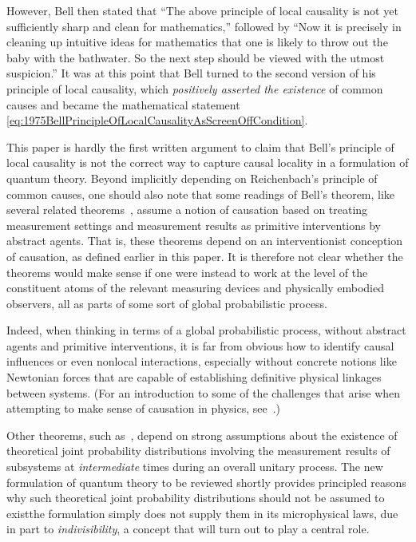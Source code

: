 \documentclass[twoside,twocolumn,english,prl,superscriptaddress,nobibnotes,nofootinbib]{revtex4-2}
\begin{document}
However, Bell then stated that ``The above principle of local causality
is not yet sufficiently sharp and clean for mathematics,'' followed
by ``Now it is precisely in cleaning up intuitive ideas for mathematics
that one is likely to throw out the baby with the bathwater. So the
next step should be viewed with the utmost suspicion.'' It was at
this point that Bell turned to the second version of his principle
of local causality, which \emph{positively asserted the existence}
of common causes and became the mathematical statement \eqref{eq:1975BellPrincipleOfLocalCausalityAsScreenOffCondition}.

This paper is hardly the first written argument to claim that Bell's
principle of local causality is not the correct way to capture causal
locality in a formulation of quantum theory. Beyond implicitly depending
on Reichenbach's principle of common causes, one should also note
that some readings of Bell's theorem, like several related theorems~\citep{ClauserHorneShimonyHolt:1969pettlhvt,GreenbergerHorneZeilinger:1989gbbt},
assume a notion of causation based on treating measurement settings
and measurement results as primitive interventions by abstract agents.
That is, these theorems depend on an interventionist conception of
causation, as defined earlier in this paper. It is therefore not clear
whether the theorems would make sense if one were instead to work
at the level of the constituent atoms of the relevant measuring devices
and physically embodied observers, all as parts of some sort of global
probabilistic process.

Indeed, when thinking in terms of a global probabilistic process,
without abstract agents and primitive interventions, it is far from
obvious how to identify causal influences or even nonlocal interactions,
especially without concrete notions like Newtonian forces that are
capable of establishing definitive physical linkages between systems.
(For an introduction to some of the challenges that arise when attempting
to make sense of causation in physics, see~\citep{Frisch:2024cip}.)

Other theorems, such as~\citep{BongUtrerasAlarconGhafariLiangTischlerCavalcantiPrydeWiseman:2020asngtotwfp},
depend on strong assumptions about the existence of theoretical joint
probability distributions involving the measurement results of subsystems
at \emph{intermediate} times during an overall unitary process. The
new formulation of quantum theory to be reviewed shortly provides
principled reasons why such theoretical joint probability distributions
should not be assumed to exist\textemdash the formulation simply does
not supply them in its microphysical laws, due in part to \emph{indivisibility},
a concept that will turn out to play a central role. 
\end{document}
